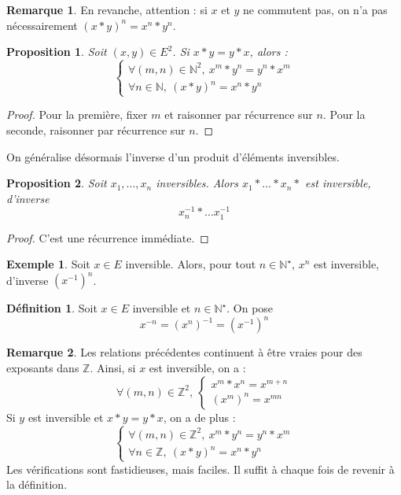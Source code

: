\documentclass[french]{book}
\newcommand{\N}{\mathbb{N}}
\newcommand{\Z}{\mathbb{Z}}
\newcommand{\st}{^\star}
\newcommand{\inv}{^{-1}}
\theoremstyle{plain}
\newtheorem{prop}{Proposition}[chapter]
\theoremstyle{definition}
\newtheorem{dfn}{Définition}[chapter]
\newtheorem{exa}{Exemple}[chapter]
\newtheorem{rmq}{Remarque}[chapter]
\theoremstyle{remark}
\begin{document}
\begin{rmq}
	En revanche, attention : si $x$ et $y$ ne commutent pas, on n'a pas nécessairement $(x*y)^n=x^n*y^n$.
\end{rmq}
\begin{prop}
	Soit $(x,y)\in E^2$. Si $x*y=y*x$, alors : $$\left\{\begin{array}{ll}\forall(m,n)\in\N^2,\ x^m*y^n=y^n*x^m \\ \forall n\in\N,\ (x*y)^n=x^n*y^n \end{array}\right.$$
\end{prop}
\begin{proof}
	Pour la première, fixer $m$ et raisonner par récurrence sur $n$. Pour la seconde, raisonner par récurrence sur $n$.
\end{proof}
On généralise désormais l'inverse d'un produit d'éléments inversibles.
\begin{prop}
	Soit $x_1,\ldots,x_n$ inversibles. Alors $x_1*\ldots*x_n*$ est inversible, d'inverse $$x_n\inv*\ldots x_1\inv$$
\end{prop}
\begin{proof}
	C'est une récurrence immédiate.
\end{proof}
\begin{exa}
	Soit $x\in E$ inversible. Alors, pour tout $n\in\N\st$, $x^n$ est inversible, d'inverse $(x\inv)^n$.
\end{exa}
\begin{dfn}
	Soit $x\in E$ inversible et $n\in\N\st$. On pose $$x^{-n}=(x^n)\inv=(x\inv)^n$$
\end{dfn}
\begin{rmq}
	Les relations précédentes continuent à être vraies pour des exposants dans $\Z$. Ainsi, si $x$ est inversible, on a : $$\forall (m,n)\in\Z^2,\ \left \{ \begin{array}{ll} x^m*x^n=x^{m+n} \\ (x^m)^n=x^{mn}\end{array}\right.$$ Si $y$ est inversible et $x*y=y*x$, on a de plus : $$\left\{\begin{array}{ll}\forall(m,n)\in\Z^2,\ x^m*y^n=y^n*x^m \\ \forall n\in\Z,\ (x*y)^n=x^n*y^n \end{array}\right.$$ Les vérifications sont fastidieuses, mais faciles. Il suffit à chaque fois de revenir à la définition. 
\end{rmq}
\end{document}
